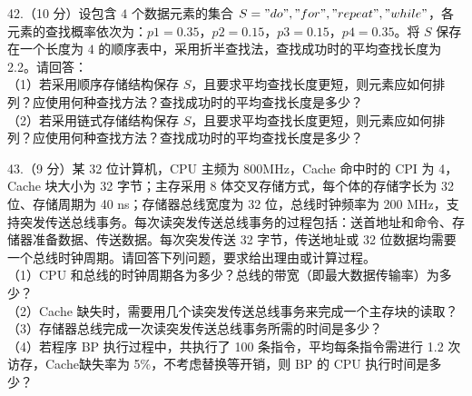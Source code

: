 42.（10 分）设包含 $4$ 个数据元素的集合 $S={"do","for"," repeat"," while"}$，各元素的查找概率依次为：$p1=0.35$，$p2 = 0.15$，$p3=0.15$，$p4=0.35$。将 $S$ 保存在一个长度为 $4$ 的顺序表中，采用折半查找法，查找成功时的平均查找长度为2.2。请回答： \\
（1）若采用顺序存储结构保存 $S$，且要求平均查找长度更短，则元素应如何排列？应使用何种查找方法？查找成功时的平均查找长度是多少？ \\
（2）若采用链式存储结构保存 $S$，且要求平均查找长度更短，则元素应如何排列？应使用何种查找方法？查找成功时的平均查找长度是多少？

43.（9 分）某 32 位计算机，CPU 主频为 800MHz，Cache 命中时的 CPI 为 4，Cache 块大小为
32 字节；主存采用 8 体交叉存储方式，每个体的存储字长为 32 位、存储周期为 40 ns；存储器总线宽度为 32 位，总线时钟频率为 200 MHz，支持突发传送总线事务。每次读突发传送总线事务的过程包括：送首地址和命令、存储器准备数据、传送数据。每次突发传送 32 字节，传送地址或 32 位数据均需要一个总线时钟周期。请回答下列问题，要求给出理由或计算过程。  \\
（1）CPU 和总线的时钟周期各为多少？总线的带宽（即最大数据传输率）为多少？  \\
（2）Cache 缺失时，需要用几个读突发传送总线事务来完成一个主存块的读取？  \\
（3）存储器总线完成一次读突发传送总线事务所需的时间是多少？  \\
（4）若程序 BP 执行过程中，共执行了 100 条指令，平均每条指令需进行 1.2 次访存，Cache缺失率为 5\%，不考虑替换等开销，则 BP 的 CPU 执行时间是多少？ 

